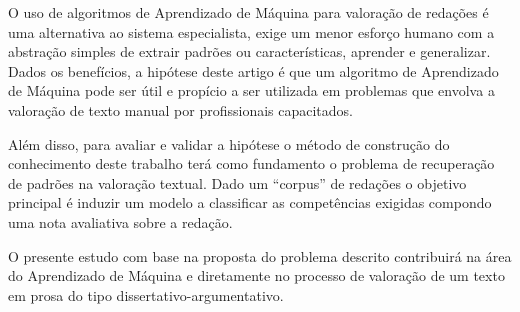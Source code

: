 O uso de algoritmos de Aprendizado de Máquina para valoração de redações é uma
alternativa ao sistema especialista, exige um menor esforço humano com a 
abstração simples de extrair padrões ou características, aprender e generalizar.
Dados os benefícios, a hipótese deste artigo é que um algoritmo de Aprendizado 
de Máquina pode ser útil e propício a ser utilizada em problemas que envolva a 
valoração de texto manual por profissionais capacitados. 

Além disso, para avaliar e validar a hipótese o método de construção do 
conhecimento deste trabalho terá como fundamento o problema de recuperação de 
padrões na valoração textual. Dado um ``corpus'' de redações o objetivo 
principal é induzir um modelo a classificar as competências exigidas compondo 
uma nota avaliativa sobre a redação.

O presente estudo com base na proposta do 
problema descrito contribuirá na área do Aprendizado de Máquina e diretamente 
no processo de valoração de um texto em prosa do tipo 
dissertativo-argumentativo.